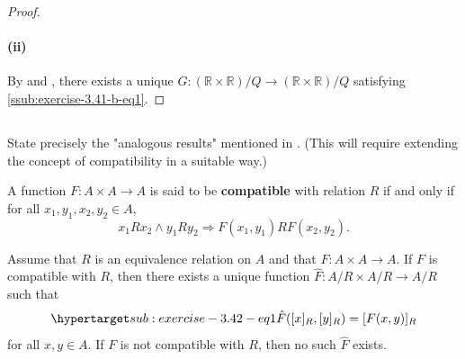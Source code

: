 \documentclass{report}
\begin{document}
\begin{proof}
    \paragraph{(ii)}%

      By  and , there
        exists a unique $G \colon (\mathbb{R} \times \mathbb{R}) / Q \rightarrow
        (\mathbb{R} \times \mathbb{R}) / Q$ satisfying
        \eqref{ssub:exercise-3.41-b-eq1}.

  \end{proof}

\subsection{}%

  State precisely the "analogous results" mentioned in .
  (This will require extending the concept of compatibility in a suitable way.)

  \linedivider

  \begin{theorem}[3.42]
    A function $F \colon A \times A \rightarrow A$ is said to be
      \textbf{compatible} with relation $R$ if and only if for all
      $x_1, y_1, x_2, y_2 \in A$,
      $$x_1Rx_2 \land y_1Ry_2 \Rightarrow F(x_1, y_1)RF(x_2, y_2).$$

    \noindent
    Assume that $R$ is an equivalence relation on $A$ and that
      $F \colon A \times A \rightarrow A$.
    If $F$ is compatible with $R$, then there exists a unique function
      $\hat{F} \colon A / R \times A / R \rightarrow A / R$ such that
      \begin{equation}
        \hyperlabel{sub:exercise-3.42-eq1}
        \hat{F}([x]_R, [y]_R) = [F(x, y)]_R
      \end{equation}
      for all $x, y \in A$.
    If $F$ is not compatible with $R$, then no such $\hat{F}$ exists.
  \end{theorem}
\end{document}
